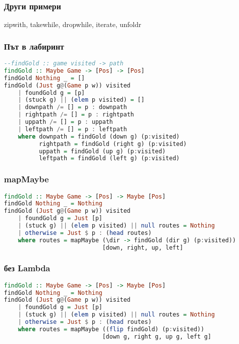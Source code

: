 \documentclass{beamer}
\begin{document}
\begin{frame}[fragile]
  \frametitle{Други примери}

  zipwith, takewhile, dropwhile, iterate, unfoldr

\end{frame}


\begin{frame}[fragile]
  \frametitle{Път в лабиринт}

  \begin{lstlisting}[basicstyle=\tiny,language=Haskell]
--findGold :: game visited -> path
findGold :: Maybe Game -> [Pos] -> [Pos]
findGold Nothing _ = []
findGold (Just g@(Game p w)) visited
    | foundGold g = [p]
    | (stuck g) || (elem p visited) = []
    | downpath /= [] = p : downpath
    | rightpath /= [] = p : rightpath
    | uppath /= [] = p : uppath
    | leftpath /= [] = p : leftpath
    where downpath = findGold (down g) (p:visited)
          rightpath = findGold (right g) (p:visited)
          uppath = findGold (up g) (p:visited)
          leftpath = findGold (left g) (p:visited)  
  \end{lstlisting}
  
\end{frame}


\begin{frame}[fragile]
  \frametitle{mapMaybe}

\begin{lstlisting}[basicstyle=\tiny,language=Haskell]
findGold :: Maybe Game -> [Pos] -> Maybe [Pos]
findGold Nothing _ = Nothing
findGold (Just g@(Game p w)) visited
    | foundGold g = Just [p]
    | (stuck g) || (elem p visited) || null routes = Nothing
    | otherwise = Just $ p : (head routes)
    where routes = mapMaybe (\dir -> findGold (dir g) (p:visited))
                            [down, right, up, left]  
\end{lstlisting}
  
\end{frame}

\begin{frame}[fragile]
  \frametitle{без Lambda}

\begin{lstlisting}[basicstyle=\tiny,language=Haskell]
findGold :: Maybe Game -> [Pos] -> Maybe [Pos]
findGold Nothing _ = Nothing
findGold (Just g@(Game p w)) visited
    | foundGold g = Just [p]
    | (stuck g) || (elem p visited) || null routes = Nothing
    | otherwise = Just $ p : (head routes)
    where routes = mapMaybe ((flip findGold) (p:visited))
                            [down g, right g, up g, left g]  
\end{lstlisting}
  
\end{frame}
\end{document}

